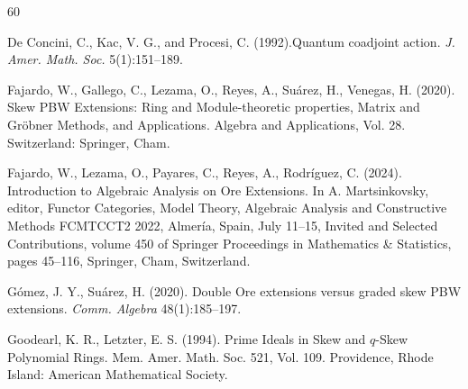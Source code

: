 \documentclass{amsart}
\theoremstyle{definition}
\theoremstyle{remark}
\numberwithin{equation}{section}
\begin{document}
\begin{thebibliography}{60}

 De Concini, C., Kac, V. G., and Procesi, C. (1992).Quantum coadjoint action. {\em J. Amer. Math. Soc.} 5(1):151--189.



 Fajardo, W., Gallego, C., Lezama, O., Reyes, A., Su\'arez, H., Venegas, H. (2020). Skew PBW Extensions: Ring and Module-theoretic properties, Matrix and Gr\"obner Methods, and Applications. Algebra and Applications, Vol. 28. Switzerland: Springer, Cham.

 Fajardo, W., Lezama, O., Payares, C., Reyes, A., Rodr\'iguez, C. (2024). Introduction to Algebraic Analysis on Ore Extensions. In A. Martsinkovsky, editor, Functor Categories, Model Theory, Algebraic Analysis and Constructive Methods FCMTCCT2 2022, Almer\'ia, Spain, July 11--15, Invited and Selected Contributions, volume 450 of Springer Proceedings in Mathematics \& Statistics, pages 45--116, Springer, Cham, Switzerland.




 G\'omez, J. Y., Su\'arez, H. (2020). Double Ore extensions versus graded skew PBW extensions. {\em Comm. Algebra} 48(1):185--197.

 Goodearl, K. R., Letzter, E. S. (1994). Prime {I}deals in {S}kew and $q$-{S}kew {P}olynomial {R}ings. Mem. Amer. Math. Soc. 521, Vol. 109. Providence, Rhode Island: American Mathematical Society.


\end{thebibliography}
\end{document}
